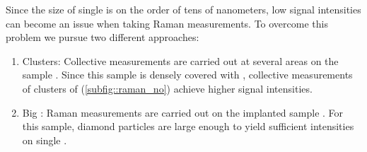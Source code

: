 			Since the size of single \nds is on the order of tens of nanometers, low signal intensities can become an issue when taking Raman measurements.
			To overcome this problem we pursue two different approaches:
			\begin{enumerate}[label=\alph*),ref=\alph*)]
				\item \Nd Clusters: \label{item::raman_gband} Collective measurements are carried out at several areas on the sample \insituS. Since this sample is densely covered with \nds, collective measurements of clusters of \nds (\autoref{subfig::raman_no}) achieve higher signal intensities.
				\item Big \Nds: \label{item::raman_implanted} Raman measurements are carried out on the implanted sample \implantedTao. For this sample, diamond particles are large enough to yield sufficient intensities on single \nds.
			\end{enumerate}


